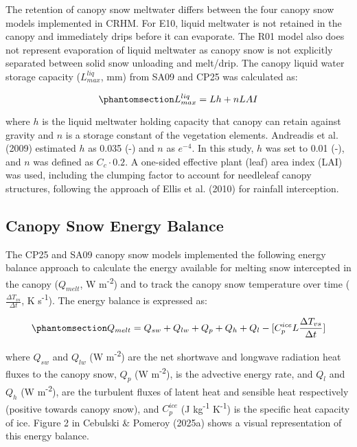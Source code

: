 \documentclass[
]{agujournal2019}
\begin{document}
The retention of canopy snow meltwater differs between the four canopy
snow models implemented in CRHM. For E10, liquid meltwater is not
retained in the canopy and immediately drips before it can evaporate.
The R01 model also does not represent evaporation of liquid meltwater as
canopy snow is not explicitly separated between solid snow unloading and
melt/drip. The canopy liquid water storage capacity (\(L_{max}^{liq}\),
mm) from SA09 and CP25 was calculated as:

\begin{equation}\phantomsection\label{eq-liq-hold-cap}{
L_{max}^{liq} = Lh + nLAI
}\end{equation}

where \(h\) is the liquid meltwater holding capacity that canopy can
retain against gravity and \(n\) is a storage constant of the vegetation
elements. Andreadis et al. (2009) estimated \(h\) as 0.035 (-) and \(n\)
as \(e^{-4}\). In this study, \(h\) was set to 0.01 (-), and \(n\) was
defined as \(C_c\cdot 0.2\). A one-sided effective plant (leaf) area
index (LAI) was used, including the clumping factor to account for
needleleaf canopy structures, following the approach of Ellis et al.
(2010) for rainfall interception.

\subsection{Canopy Snow Energy Balance}\label{sec-ebal}

The CP25 and SA09 canopy snow models implemented the following energy
balance approach to calculate the energy available for melting snow
intercepted in the canopy (\(Q_{melt}\), W m\textsuperscript{-2}) and to
track the canopy snow temperature over time
(\(\frac{\Delta T_{vs}}{\Delta t}\), K s\textsuperscript{-1}). The
energy balance is expressed as:

\begin{equation}\phantomsection\label{eq-eb}{
Q_{melt} = 
Q_{sw} +
Q_{lw} +
Q_{p} + Q_{h} + Q_{l} - [C_p^{ice} L \frac{\Delta T_{vs}}{\Delta t}]
}\end{equation}

where \(Q_{sw}\) and \(Q_{lw}\) (W m\textsuperscript{-2}) are the net
shortwave and longwave radiation heat fluxes to the canopy snow, \(Q_p\)
(W m\textsuperscript{-2}), is the advective energy rate, and \(Q_{l}\)
and \(Q_{h}\) (W m\textsuperscript{-2}), are the turbulent fluxes of
latent heat and sensible heat respectively (positive towards canopy
snow), and \(C_p^{ice}\) (J kg\textsuperscript{-1}
K\textsuperscript{-1}) is the specific heat capacity of ice. Figure 2 in
Cebulski \& Pomeroy (2025a) shows a visual representation of this energy
balance.
\end{document}
